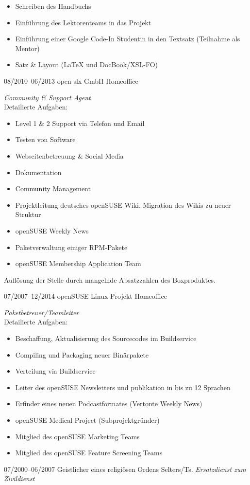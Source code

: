 \documentclass[a4paper]{friggeri-cv} %
\begin{document}
\begin{entrylist}
{\begin{itemize}
        \item Schreiben des Handbuchs
        \item Einführung des Lektorenteams in das Projekt
        \item Einführung einer Google Code-In Studentin in den Textsatz (Teilnahme als Mentor)
        \item Satz \& Layout (\LaTeX{} und DocBook/XSL-FO)
    \end{itemize}
}
\entry
{08/2010--06/2013}
{open-slx GmbH}
{Homeoffice}
{\emph{Community \& Support Agent} \\
    Detailierte Aufgaben:
    \begin{itemize}
        \item Level 1 \& 2 Support via Telefon und Email
        \item Testen von Software
        \item Webseitenbetreuung \& Social Media
        \item Dokumentation
        \item Community Management
        \item Projektleitung deutsches openSUSE Wiki. Migration des Wikis zu neuer Struktur
        \item openSUSE Weekly News
        \item Paketverwaltung einiger RPM-Pakete
        \item openSUSE Membership Application Team
    \end{itemize}
Auflösung der Stelle durch mangelnde Absatzzahlen des Boxproduktes.
}
\end{entrylist}
\begin{entrylist}
\entry
{07/2007--12/2014}
{openSUSE Linux Projekt}
{Homeoffice}
{\emph{Paketbetreuer/Teamleiter}\\
    Detailierte Aufgaben:
    \begin{itemize}
        \item Beschaffung, Aktualisierung des Sourcecodes im Buildservice
        \item Compiling und Packaging neuer Binärpakete
        \item Verteilung via Buildservice
        \item Leiter des openSUSE Newsletters und publikation in bis zu 12 Sprachen
        \item Erfinder eines neuen Podcastformates (Vertonte Weekly News)
        \item openSUSE Medical Project (Subprojektgründer)
        \item Mitglied des openSUSE Marketing Teams
        \item Mitglied des openSUSE Feature Screening Teams
    \end{itemize}
}
\entry
{07/2000--06/2007}
{Geistlicher eines religiösen Ordens}
{Selters/Ts.}
{\emph{Ersatzdienst zum Zivildienst}}
\end{entrylist}
\end{document}
